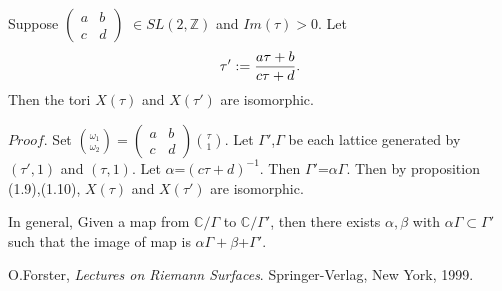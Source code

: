 \begin{cor} Suppose $\begin{pmatrix} a & b \\ c & d \end{pmatrix}$ $\in SL(2,\mathbb{Z})$ and $Im(\tau)>0$. Let
\begin{equation*} \tau':={a\tau+b \over c\tau+d}.
\end{equation*}
Then the tori $X(\tau)$ and $X(\tau')$ are isomorphic.
\end{cor}
$Proof$.  Set ${\omega_1 \choose \omega_2 }=\begin{pmatrix} a & b \\ c & d \end{pmatrix}$${\tau \choose 1}$. Let $\Gamma'$,$\Gamma$ be each lattice generated by $(\tau',1)$ and $(\tau,1)$. Let $\alpha $=$(c\tau+d)^{-1}$. Then $\Gamma'$=$\alpha\Gamma$.
Then by proposition (1.9),(1.10), $X(\tau)$ and $X(\tau')$ are isomorphic.  
\vspace{2ex}

In general, Given a map from $\mathbb{C}/\Gamma$ to $\mathbb{C}/\Gamma'$, then there exists $\alpha,\beta$ with $\alpha\Gamma \subset \Gamma'$ such that the image of map is $\alpha\Gamma+\beta$+$\Gamma'$.  
 

\begin{thebibliography}{30}
O.Forster, \emph{Lectures on Riemann Surfaces}. Springer-Verlag, New York, 1999.


\end{thebibliography}





